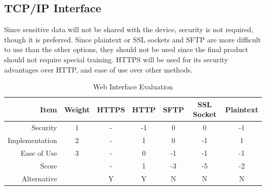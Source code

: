 \subsection{TCP/IP Interface}
Since sensitive data will not be shared with the device, security is not required, though it is preferred. 
Since plaintext or SSL sockets and SFTP are more difficult to use than the other options, they should not be used since the final product should not require special training. 
HTTPS will be used for its security advantages over HTTP, and ease of use over other methods. 

\begin{table}[h]
\caption{Web Interface Evaluation}
	\label{table:TCPIP}
	\centering
\begin{tabular}{|r|c|c|c|c|c|c|}
\hline
Item              	& Weight & HTTPS  & HTTP       & SFTP        & SSL Socket	& Plaintext\\ \hline
Security       	& 1      & -      & -1         & 0           & 0          	& -1   \\ \hline
Implementation	& 2      & -      & 1          & 0           & -1     		& 1   \\ \hline
Ease of Use       	& 3      & -      & 0          & -1          & -1         	& -1 \\ \hline
Score         	&        & -      & 1          & -3          & -5         	& -2   \\ \hline
Alternative     	&        & Y      & Y          & N           & N       	& N   \\ \hline
\end{tabular}
\end{table}

